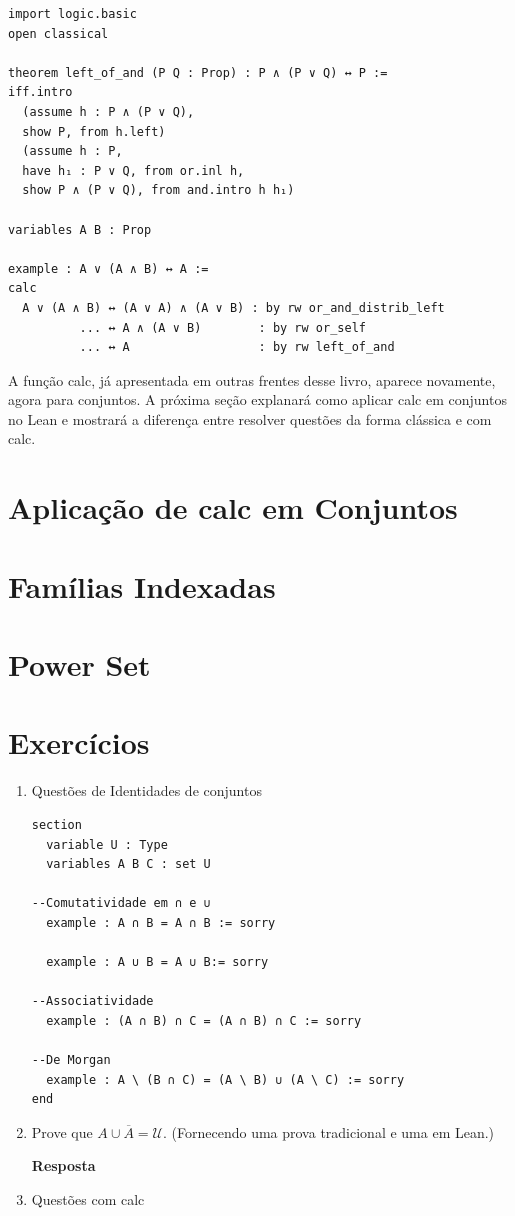 \begin{lstlisting}
import logic.basic
open classical

theorem left_of_and (P Q : Prop) : P ∧ (P ∨ Q) ↔ P :=
iff.intro
  (assume h : P ∧ (P ∨ Q),
  show P, from h.left)
  (assume h : P,
  have h₁ : P ∨ Q, from or.inl h,
  show P ∧ (P ∨ Q), from and.intro h h₁)

variables A B : Prop

example : A ∨ (A ∧ B) ↔ A :=
calc
  A ∨ (A ∧ B) ↔ (A ∨ A) ∧ (A ∨ B) : by rw or_and_distrib_left
          ... ↔ A ∧ (A ∨ B)        : by rw or_self
          ... ↔ A                  : by rw left_of_and
\end{lstlisting}

A função calc, já apresentada em outras frentes desse livro, aparece novamente, agora para conjuntos. A próxima seção explanará como aplicar calc em conjuntos no Lean e mostrará a diferença entre resolver questões da forma clássica e com calc.

\section{Aplicação de calc em Conjuntos}

\section{Famílias Indexadas}

\section{Power Set}

\section{Exercícios}

\begin{enumerate}
    
\item Questões de Identidades de conjuntos
    
\begin{lstlisting}
section
  variable U : Type
  variables A B C : set U

--Comutatividade em ∩ e ∪ 
  example : A ∩ B = A ∩ B := sorry

  example : A ∪ B = A ∪ B:= sorry

--Associatividade
  example : (A ∩ B) ∩ C = (A ∩ B) ∩ C := sorry

--De Morgan
  example : A \ (B ∩ C) = (A \ B) ∪ (A \ C) := sorry
end
\end{lstlisting}

\item Prove que $A \cup \overline A = \mathcal U$. (Fornecendo uma prova tradicional e uma em Lean.)

\textbf{Resposta} 




\item Questões com calc
    
    
\end{enumerate}
